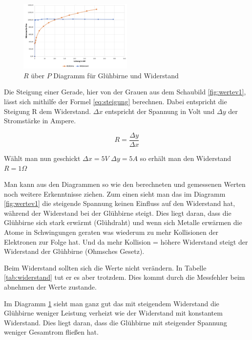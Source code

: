         \begin{figure}[H]
            \centering
            \includegraphics[width=0.5\textwidth]{bilder/Physik_03.png}
            \caption{$R$ über $P$ Diagramm für Glühbirne und Widerstand}
            \label{fig:wertev2}
        \end{figure}

        Die Steigung einer Gerade, hier von der Grauen aus dem Schaubild \ref{fig:wertev1}, lässt sich mithilfe der Formel \ref{eq:steigung} berechnen. Dabei entspricht die Steigung R dem Widerstand. $\Delta x$ entspricht der Spannung in Volt und $\Delta y$ der Stromstärke in Ampere. 
      
        \begin{equation}
            R = \frac{\Delta y}{\Delta x}
            \label{eq:steigung}
        \end{equation}
     
        Wählt man nun geschickt $\Delta x= 5V$  $\Delta y=5A$ so erhält man den Widerstand $R = 1 \Omega$

        Man kann aus den Diagrammen so wie den berechneten und gemessenen Werten noch weitere Erkenntnisse ziehen. Zum einen sieht man das im Diagramm \ref{fig:wertev1} die steigende Spannung keinen Einfluss auf den Widerstand hat, während der Widerstand bei der Glühbirne steigt. Dies liegt daran, dass die Glühbirne sich stark erwärmt (Glühdraht) und wenn sich Metalle erwärmen die Atome in Schwingungen geraten was wiederum zu mehr Kollisionen der Elektronen zur Folge hat. Und da mehr Kollision = höhere Widerstand steigt der Widerstand der Glühbirne (Ohmsches Gesetz). 
        
        Beim Widerstand sollten sich die Werte nicht verändern. In Tabelle \ref{tab:widerstand} tut er es aber trotzdem. Dies kommt durch die Messfehler beim abnehmen der Werte zustande. 

        Im Diagramm \ref{fig:wertev2} sieht man ganz gut das mit steigendem Widerstand die Glühbirne weniger Leistung verheizt wie der Widerstand mit konstantem Widerstand. Dies liegt daran, dass die Glühbirne mit steigender Spannung weniger Gesamtrom fließen hat.

